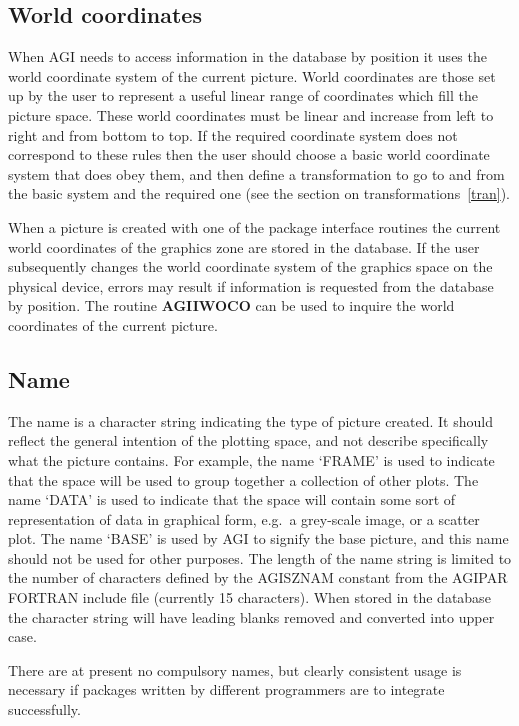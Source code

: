 \documentclass[twoside,11pt]{article}
\newcommand{\hyperref}[4]{#2\ref{#4}#3}
\newcommand{\htmlref}[2]{#1}
\renewcommand{\_}{\texttt{\symbol{95}}}
\begin{document}
\subsection{World coordinates}
When AGI needs to access information in the database by position it uses the
world coordinate system of the current picture.
World coordinates are those set up by the user to represent a useful linear
range of coordinates which fill the picture space.
These world coordinates must be linear and increase from left to right
and from bottom to top. If the required coordinate system does not correspond
to these rules then the user should choose a basic world coordinate system
that does obey them, and then define a transformation to go to and from
the basic system and the required one (see 
\hyperref{this section}{the section on transformations~}{}{tran}).

When a picture is created with one of the package interface routines the
current world coordinates of the graphics zone are stored in the database.
If the user subsequently changes the world coordinate system of the graphics
space on the physical device, errors may result if information is requested
from the database by position.
The routine \htmlref{{\bf AGI\_IWOCO}}{AGI_IWOCO}
can be used to inquire the world coordinates of the current picture.

\subsection{Name}
The name is a character string indicating the type of picture created.
It should reflect the general intention of the plotting space, and not
describe specifically what the picture contains.
For example, the name `FRAME' is used to indicate that the space will be used
to group together a collection of other plots.
The name `DATA' is used to indicate that the space will contain some sort of
representation of data in graphical form, e.g.\ a grey-scale image, or a
scatter plot.
The name `BASE' is used by AGI to signify the base picture, and this name
should not be used for other purposes.
The length of the name string is limited to the number of characters defined
by the AGI\_\_SZNAM constant from the AGI\_PAR FORTRAN include file
(currently 15 characters).
When stored in the database the character string will have leading blanks
removed and converted into upper case.

There are at present no compulsory names, but clearly consistent usage is
necessary if packages written by different programmers are to integrate
successfully.
\end{document}
